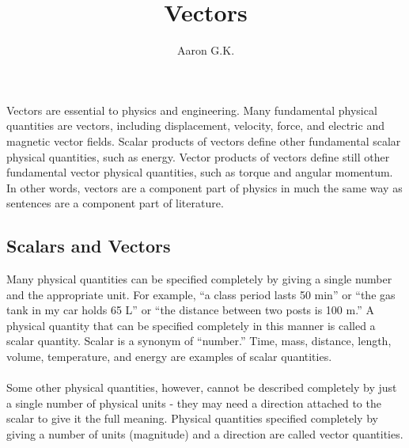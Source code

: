 \documentclass[11pt]{article}
\title{Vectors}
\author{Aaron G.K.}
\begin{document}
	\maketitle
	Vectors are essential to physics and engineering. Many fundamental physical quantities are vectors, including displacement, velocity, force, and electric and magnetic vector fields. Scalar products of vectors define other fundamental scalar physical quantities, such as energy. Vector products of vectors define still other fundamental vector physical quantities, such as torque and angular momentum. In other words, vectors are a component part of physics in much the same way as sentences are a component part of literature.
	\subsection*{Scalars and Vectors}
    Many physical quantities can be specified completely by giving a single number and the appropriate unit. For example, “a class period lasts 50 min” or “the gas tank in my car holds 65 L” or “the distance between two posts is 100 m.” A physical quantity that can be specified completely in this manner is called a scalar quantity. Scalar is a synonym of “number.” Time, mass, distance, length, volume, temperature, and energy are examples of scalar quantities.
    \\ \\
    Some other physical quantities, however, cannot be described completely by just a single number of physical units - they may need a direction attached to the scalar to give it the full meaning. Physical quantities specified completely by giving a number of units (magnitude) and a direction are called vector quantities. 
\end{document}

